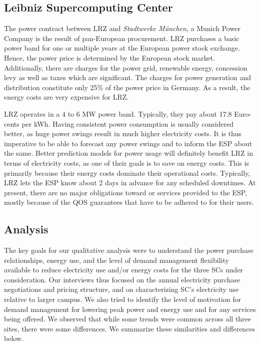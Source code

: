 \subsection{Leibniz Supercomputing Center}
The power contract between LRZ and \emph{Stadtwerke M{\"u}nchen}, a Munich Power Company
is the result of pan-European procurement. LRZ purchases a basic power band for one
or multiple years at the European power stock exchange. Hence, the power price is
determined by the European stock market. Additionally, there are charges for the
power grid, renewable energy, concession levy as well as taxes which are significant.
The charges for power generation and distribution constitute only 25\% of
the power price in Germany. As a result, the energy costs are very expensive for LRZ.

LRZ operates in a 4 to 6 MW power band. Typically, they pay about
17.8 Euro-cents per kWh. Having consistent power consumption is usually considered better,
as huge power swings result in much higher electricity costs. It is thus imperative
to be able to forecast any power swings and to inform the ESP about
the same. Better prediction models for power usage will definitely benefit
LRZ in terms of electricity costs, as one of their goals is to save on
energy costs. This is primarily because their energy costs dominate their
operational costs. Typically, LRZ lets the ESP know about 2 days in
advance for any scheduled downtimes. At present, there are no major
obligations toward or services provided to the ESP, mostly because of
the QOS guarantees that have to be adhered to for their users.

\subsection{Analysis}
The key goals for our qualitative analysis were to understand the power purchase relationships, energy use, and the level of demand management flexibility available to reduce electricity use and/or energy costs for the three SCs under consideration. Our interviews thus focused on the annual electricity purchase negotiations and pricing structure, and on characterizing SC's electricity use relative to larger campus. We also tried to identify the level of motivation for demand management for lowering peak power and energy use and for any services being offered. We observed that while some trends were common across all three sites, there were some differences. We summarize these similarities and differences below. \\

